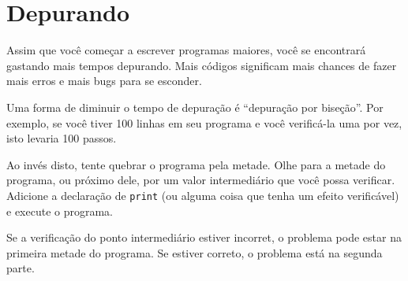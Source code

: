 \section{Depurando}


Assim que você começar a escrever programas maiores, você se encontrará
gastando mais tempos depurando. Mais códigos significam mais chances de fazer
mais erros e mais bugs para se esconder.



Uma forma de diminuir o tempo de depuração é ``depuração por biseção''. Por
exemplo, se você tiver 100 linhas em seu programa e você verificá-la uma por
vez, isto levaria 100 passos.


Ao invés disto, tente quebrar o programa pela metade. Olhe para a metade do
programa, ou próximo dele, por um valor intermediário que você possa verificar.
Adicione a declaração de {\tt print} (ou alguma coisa que tenha um efeito
verificável) e execute o programa.


Se a verificação do ponto intermediário estiver incorret, o problema pode
estar na primeira metade do programa. Se estiver correto, o problema está
na segunda parte.


